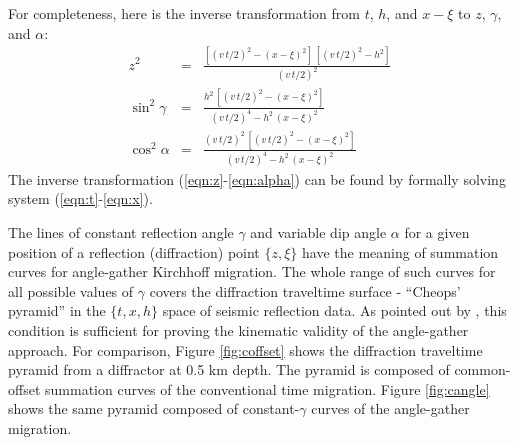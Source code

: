 For completeness, here is the inverse transformation from $t$, $h$,
and $x-\xi$ to $z$, $\gamma$, and $\alpha$:
\begin{eqnarray}
  \label{eqn:z}
  z^2 & = & 
  \frac{
    \left[(v\,t/2)^2 - (x-\xi)^2\right]\,
    \left[(v\,t/2)^2 - h^2\right]
    }{(v\,t/2)^2} 
  \\ \label{eqn:gamma}
  \sin^2{\gamma} & = & 
  \frac{h^2\, \left[(v\,t/2)^2 - (x-\xi)^2\right]}
  {(v\,t/2)^4 - h^2\,(x-\xi)^2}
  \\ \label{eqn:alpha}
  \cos^2{\alpha} & = & 
  \frac{(v\,t/2)^2\, \left[(v\,t/2)^2 - (x-\xi)^2\right]}
  {(v\,t/2)^4 - h^2\,(x-\xi)^2}
\end{eqnarray}
The inverse transformation (\ref{eqn:z}-\ref{eqn:alpha}) can be found
by formally solving system (\ref{eqn:t}-\ref{eqn:x}).
\par
The lines of constant reflection angle $\gamma$ and variable dip angle
$\alpha$ for a given position of a reflection (diffraction) point
$\{z,\xi\}$ have the meaning of summation curves for angle-gather
Kirchhoff migration. The whole range of such curves for all possible
values of $\gamma$ covers the diffraction traveltime surface -
``Cheops' pyramid'' \cite{Claerbout.blackwell.85} in the $\{t,x,h\}$
space of seismic reflection data.  As pointed out by
, this condition is sufficient for proving the
kinematic validity of the angle-gather approach.  For comparison,
Figure \ref{fig:coffset} shows the diffraction traveltime pyramid from
a diffractor at 0.5 km depth.  The pyramid is composed of
common-offset summation curves of the conventional time migration.
Figure \ref{fig:cangle} shows the same pyramid composed of
constant-$\gamma$ curves of the angle-gather migration.




